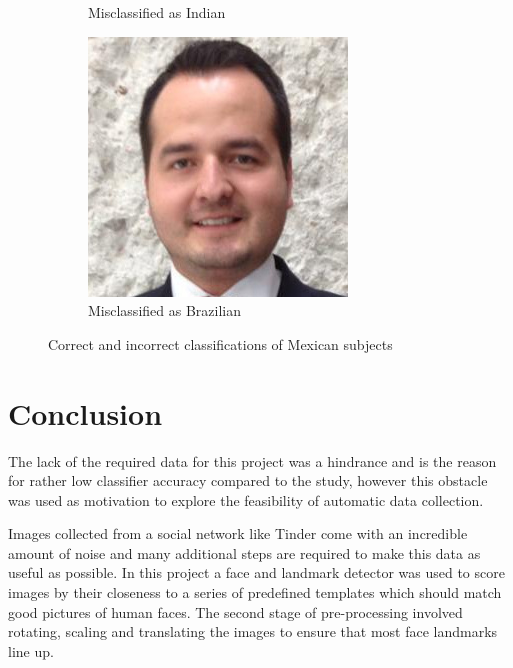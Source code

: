 \begin{figure}
\begin{subfigure}[b]{0.3\textwidth}
      \caption{Misclassified as Indian}
    \end{subfigure}
    \begin{subfigure}[b]{0.3\textwidth}
        \includegraphics[width=\textwidth]{figures/results/misclassification/mexico-brazil.jpg}
      \caption{Misclassified as Brazilian}
    \end{subfigure}
\caption{Correct and incorrect classifications of Mexican subjects}
\label{fig:results:dc:misclass:mexico}
\end{figure}

\section{Conclusion}
The lack of the required data for this project was a hindrance and is the
reason for rather low classifier accuracy compared to the \citep{chinesegroups}
study, however this obstacle was used as motivation to explore the feasibility
of automatic data collection.

Images collected from a social network like Tinder come with an incredible
amount of noise and many additional steps are required to make this data as
useful as possible. In this project a face and landmark detector was used to
score images by their closeness to a series of predefined templates which
should match good pictures of human faces. The second stage of pre-processing
involved rotating, scaling and translating the images to ensure that most face
landmarks line up.

